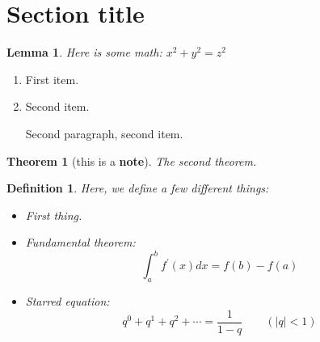 \documentclass{amsart}
\newtheorem{lemma}{Lemma}
\newtheorem{theorem}{Theorem}
\newtheorem{definition}{Definition}
\begin{document}
\section{Section title}
\begin{lemma}\label{lm:first}Here is some math: $x^2+y^2=z^2$\end{lemma}
  \begin{enumerate}
    \item First item.
    \item Second item.

    Second paragraph, second item.
  \end{enumerate}
\begin{theorem}[this is a \textbf{note}]\label{th:second}
The second theorem.
\end{theorem}
\begin{definition}
  Here, we define a few different things:
  \begin{itemize}
  \item First thing.

  \item Fundamental theorem:
  \[
    \int_a^b f^\prime(x)dx = f(b) - f(a)
  \]
  \item Starred equation:
  $$
    q^0 + q^1 + q^2 + \cdots = \frac{1}{1-q}\qquad(|q|<1)
    $$
  \end{itemize}
\end{definition}
\end{document}
